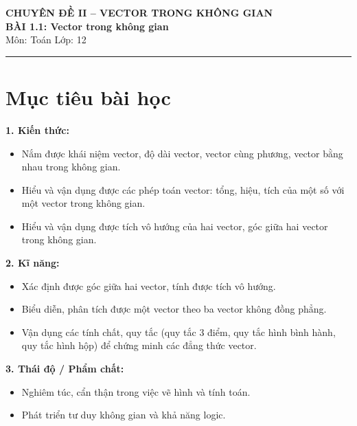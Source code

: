 \documentclass[12pt]{article}
\begin{document}
	
	\begin{center}
		{\Large\bfseries CHUYÊN ĐỀ II -- VECTOR TRONG KHÔNG GIAN}\\
		{\Large \textbf{BÀI 1.1: Vector trong không gian}}\\[4pt]
		{\large Môn: Toán \quad Lớp: 12}
	\end{center}
	\vspace{4mm}
	\hrule
	\vspace{4mm}
	
	\section*{Mục tiêu bài học}
	
	\textbf{1. Kiến thức:}
	\begin{itemize}
		\item Nắm được khái niệm vector, độ dài vector, vector cùng phương, vector bằng nhau trong không gian.
		\item Hiểu và vận dụng được các phép toán vector: tổng, hiệu, tích của một số với một vector trong không gian.
		\item Hiểu và vận dụng được tích vô hướng của hai vector, góc giữa hai vector trong không gian.
	\end{itemize}
	
	\noindent \textbf{2. Kĩ năng:}
	\begin{itemize}
		\item Xác định được góc giữa hai vector, tính được tích vô hướng.
		\item Biểu diễn, phân tích được một vector theo ba vector không đồng phẳng.
		\item Vận dụng các tính chất, quy tắc (quy tắc 3 điểm, quy tắc hình bình hành, quy tắc hình hộp) để chứng minh các đẳng thức vector.
	\end{itemize}
	
	\noindent \textbf{3. Thái độ / Phẩm chất:}
	\begin{itemize}
		\item Nghiêm túc, cẩn thận trong việc vẽ hình và tính toán.
		\item Phát triển tư duy không gian và khả năng logic.
	\end{itemize}
	
	\newpage
	
	\setcounter{tocdepth}{2}
	\tableofcontents
	\newpage
	
\end{document}
